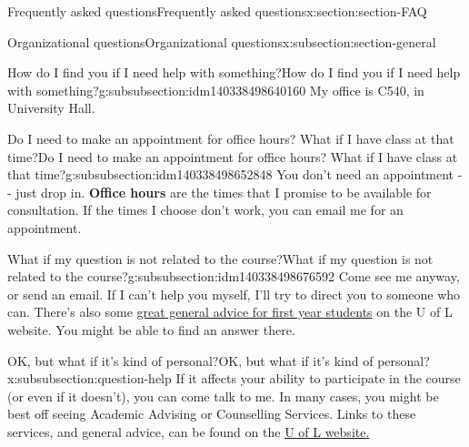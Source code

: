 \documentclass[oneside,10pt,]{article}
\newcommand{\terminology}[1]{\textbf{#1}}
\begin{document}
\begin{sectionptx}{Frequently asked questions}{}{Frequently asked questions}{}{}{x:section:section-FAQ}
\begin{subsectionptx}{Organizational questions}{}{Organizational questions}{}{}{x:subsection:section-general}
\typeout{************************************************}
%
\begin{subsubsectionptx}{How do I find you if I need help with something?}{}{How do I find you if I need help with something?}{}{}{g:subsubsection:idm140338498640160}
My office is C540, in University Hall.%
\end{subsubsectionptx}
%
%
\typeout{************************************************}
\typeout{************************************************}
%
\begin{subsubsectionptx}{Do I need to make an appointment for office hours? What if I have class at that time?}{}{Do I need to make an appointment for office hours? What if I have class at that time?}{}{}{g:subsubsection:idm140338498652848}
You don't need an appointment -{}-{} just drop in. \terminology{Office hours} are the times that I promise to be available for consultation. If the times I choose don't work, you can email me for an appointment.%
\end{subsubsectionptx}
%
%
\typeout{************************************************}
\typeout{************************************************}
%
\begin{subsubsectionptx}{What if my question is not related to the course?}{}{What if my question is not related to the course?}{}{}{g:subsubsection:idm140338498676592}
Come see me anyway, or send an email. If I can't help you myself, I'll try to direct you to someone who can. There's also some \href{https://www.uleth.ca/services-for-students/what-do-i-do-if}{great general advice for first year students} on the U of L website. You might be able to find an answer there.%
\end{subsubsectionptx}
%
%
\typeout{************************************************}
\typeout{************************************************}
%
\begin{subsubsectionptx}{OK, but what if it's kind of personal?}{}{OK, but what if it's kind of personal?}{}{}{x:subsubsection:question-help}
If it affects your ability to participate in the course (or even if it doesn't), you can come talk to me. In many cases, you might be best off seeing Academic Advising or Counselling Services. Links to these services, and general advice, can be found on the \href{https://www.uleth.ca/services-for-students/what-do-i-do-if/personal-non-academic}{U of L website.}%

\end{subsubsectionptx}
\end{subsectionptx}
\end{sectionptx}
\end{document}
